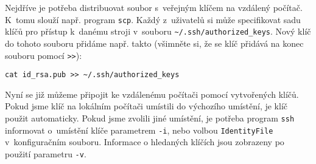 Nejdříve je potřeba distribuovat soubor s~veřejným klíčem na vzdálený počítač. K~tomu slouží
 např. program {\tt scp}. Každý z~uživatelů si může specifikovat sadu klíčů pro přístup k~danému
 stroji v~souboru \verb|~/.ssh/authorized_keys|. Nový klíč do tohoto souboru přidáme např. takto
 (všimněte si, že se klíč přidává na konec souboru pomocí \verb|>>|):

\begin{verbatim}
cat id_rsa.pub >> ~/.ssh/authorized_keys
\end{verbatim}

Nyní se již můžeme připojit ke vzdálenému počítači pomocí vytvořených klíčů. Pokud jsme klíč
 na lokálním počítači umístili do výchozího umístění, je klíč použit automaticky. Pokud jsme
 zvolili jiné umístění, je potřeba program {\tt ssh} informovat o~umístění klíče parametrem
 {\tt -i}, nebo volbou {\tt IdentityFile} v~konfiguračním souboru. Informace o hledaných
 klíčích jsou zobrazeny po použití parametru {\tt -v}.

